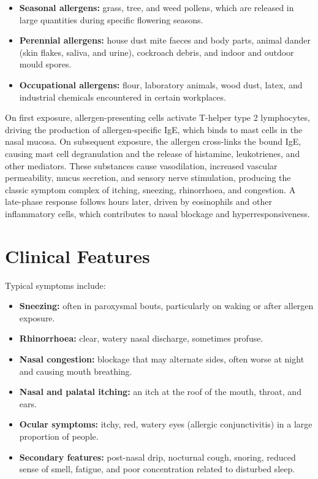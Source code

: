 \begin{itemize}
    \item \textbf{Seasonal allergens:} grass, tree, and weed pollens, which are released in large quantities during specific flowering seasons.
    \item \textbf{Perennial allergens:} house dust mite faeces and body parts, animal dander (skin flakes, saliva, and urine), cockroach debris, and indoor and outdoor mould spores.
    \item \textbf{Occupational allergens:} flour, laboratory animals, wood dust, latex, and industrial chemicals encountered in certain workplaces.
\end{itemize}

On first exposure, allergen-presenting cells activate T-helper type 2 lymphocytes, driving the production of allergen-specific IgE, which binds to mast cells in the nasal mucosa. On subsequent exposure, the allergen cross-links the bound IgE, causing mast cell degranulation and the release of histamine, leukotrienes, and other mediators. These substances cause vasodilation, increased vascular permeability, mucus secretion, and sensory nerve stimulation, producing the classic symptom complex of itching, sneezing, rhinorrhoea, and congestion. A late-phase response follows hours later, driven by eosinophils and other inflammatory cells, which contributes to nasal blockage and hyperresponsiveness.

\section*{Clinical Features}
Typical symptoms include:

\begin{itemize}
    \item \textbf{Sneezing:} often in paroxysmal bouts, particularly on waking or after allergen exposure.
    \item \textbf{Rhinorrhoea:} clear, watery nasal discharge, sometimes profuse.
    \item \textbf{Nasal congestion:} blockage that may alternate sides, often worse at night and causing mouth breathing.
    \item \textbf{Nasal and palatal itching:} an itch at the roof of the mouth, throat, and ears.
    \item \textbf{Ocular symptoms:} itchy, red, watery eyes (allergic conjunctivitis) in a large proportion of people.
    \item \textbf{Secondary features:} post-nasal drip, nocturnal cough, snoring, reduced sense of smell, fatigue, and poor concentration related to disturbed sleep.
\end{itemize}


